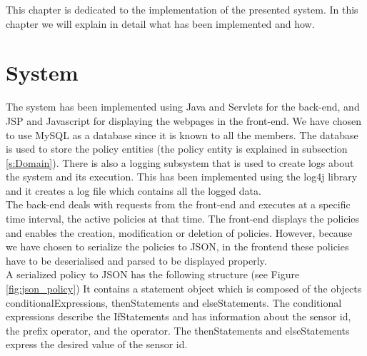 This chapter is dedicated to the implementation of the presented system. In this chapter we will explain in detail what has been implemented and how. 

\section{System}
The system has been implemented using Java and Servlets for the back-end, and JSP and Javascript for displaying the webpages in the front-end. We have chosen to use MySQL as a database since it is known to all the members. The database is used to store the policy entities (the policy entity is explained in subsection \ref{s:Domain}). There is also a logging subsystem that is used to create logs about the system and its execution. This has been implemented using the log4j library and it creates a log file which contains all the logged data. 
\\The back-end deals with requests from the front-end and executes at a specific time interval, the active policies at that time. The front-end displays the policies and enables the creation, modification or deletion of policies. However, because we have chosen to serialize the policies to JSON, in the frontend these policies have to be deserialised and parsed to be displayed properly. 
\\A serialized policy to JSON has the following structure (see Figure \ref{fig:json_policy})
It contains a statement object which is composed of the objects conditionalExpressions, thenStatements and elseStatements. 
The conditional expressions describe the IfStatements and has information about the sensor id, the prefix operator, and the operator. The thenStatements and elseStatements express the desired value of the sensor id. 

